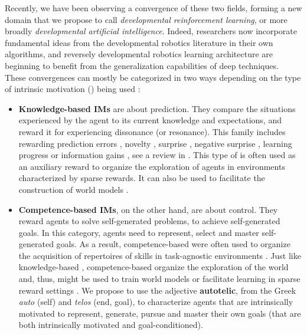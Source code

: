 Recently, we have been observing a convergence of these two fields, forming a new domain that we propose to call \textit{developmental reinforcement learning}, or more broadly \textit{developmental artificial intelligence}. Indeed, \rl researchers now incorporate fundamental ideas from the developmental robotics literature in their own algorithms, and reversely developmental robotics learning architecture are beginning to benefit from the generalization capabilities of deep \rl techniques. These convergences can mostly be categorized in two ways depending on the type of intrinsic motivation (\ims) being used \cite{oudeyer2007intrinsic}:
\begin{itemize}
    \item
    \textbf{Knowledge-based IMs} are about prediction. They compare the situations experienced by the agent to its current knowledge and expectations, and reward it for experiencing dissonance (or resonance). This family includes \ims rewarding prediction errors \cite{schmidhuber1991possibility,pathak2017curiosity}, novelty \cite{bellemare2016unifying,burda2018exploration,raileanu2020ride}, surprise \cite{achiam2017surprise}, negative surprise \cite{berseth2019smirl}, learning progress \cite{lopes2012exploration,kim2020active} or information gains \cite{houthooft2016vime}, see a review in \cite{linke2019adapting}. This type of \im is often used as an auxiliary reward to organize the exploration of agents in environments characterized by sparse rewards. It can also be used to facilitate the construction of world models \cite{lopes2012exploration,kim2020active,sekar2020planning}.
    \item
    \textbf{Competence-based IMs}, on the other hand, are about control. They reward agents to solve self-generated problems, to achieve self-generated goals. In this category, agents need to represent, select and master self-generated goals. As a result, competence-based \ims were often used to organize the acquisition of repertoires of skills in task-agnostic environments \cite{baranes2010intrinsically,baranes2013active,santucci2016grail,forestier2016modular,nair2018visual,warde2018unsupervised,curious,blaes2019control,pong2019skew,imagine}. Just like knowledge-based \ims, competence-based \ims organize the exploration of the world and, thus, might be used to train world models \cite{baranes2013active,chitnis2020glib} or facilitate learning in sparse reward settings \cite{geppg}. We propose to use the adjective \textbf{autotelic}, from the Greek \textit{auto} (self) and \textit{telos} (end, goal), to characterize agents that are intrinsically motivated to represent, generate, pursue and master their own goals (\ie that are both intrinsically motivated and goal-conditioned).
\end{itemize}

